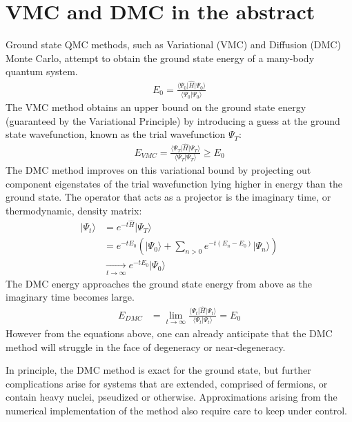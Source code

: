 \documentclass[oneside,11pt]{memoir}
\numberwithin{equation}{section}
\newcommand{\ket}[1]{\lvert #1 \rangle}
\newcommand{\bra}[1]{\langle #1 \rvert}
\newcommand{\expval}[3]{\bra{#1}\hat{#2}\ket{#3}}
\newcommand{\overlap}[2]{\langle #1 \lvert #2 \rangle}
\begin{document}
\section{VMC and DMC in the abstract}
Ground state QMC methods, such as Variational (VMC) and Diffusion (DMC) Monte 
Carlo, attempt to obtain the ground state energy of a many-body quantum system.
\begin{align}
  E_0 = \frac{\expval{\Psi_0}{H}{\Psi_0}}{\overlap{\Psi_0}{\Psi_0}}
\end{align}
The VMC method obtains an upper bound on the ground state energy (guaranteed 
by the Variational Principle) by introducing a guess at the ground state wavefunction, known as the trial wavefunction $\Psi_T$:
\begin{align}
  E_{VMC} = \frac{\expval{\Psi_T}{H}{\Psi_T}}{\overlap{\Psi_T}{\Psi_T}} \ge E_0
\end{align}
The DMC method improves on this variational bound by projecting out component 
eigenstates of the trial wavefunction lying higher in energy than the ground 
state.  The operator that acts as a projector is the imaginary time, or 
thermodynamic, density matrix:
\begin{align}
  \ket{\Psi_t} & = e^{-t\hat{H}}\ket{\Psi_T} \nonumber \\
               & = e^{-tE_0}\left( \ket{\Psi_0} + \sum_{n>0}e^{-t(E_n-E_0)}\ket{\Psi_n} \right) \nonumber \\
               &\xrightarrow[t\rightarrow\infty]{} e^{-tE_0} \ket{\Psi_0} 
\end{align}
The DMC energy approaches the ground state energy from above as the imaginary 
time becomes large. 
\begin{align}
  E_{DMC}  & = \lim_{t\rightarrow\infty}\frac{\expval{\Psi_t}{H}{\Psi_t}}{\overlap{\Psi_t}{\Psi_t}} = E_0
\end{align}
However from the equations above, one can already anticipate that the DMC 
method will struggle in the face of degeneracy or near-degeneracy.

In principle, the DMC method is exact for the ground state, but further 
complications arise for systems that are extended, comprised of fermions, 
or contain heavy nuclei, pseudized or otherwise.  Approximations arising 
from the numerical implementation of the method also require care to keep 
under control.
\end{document}
